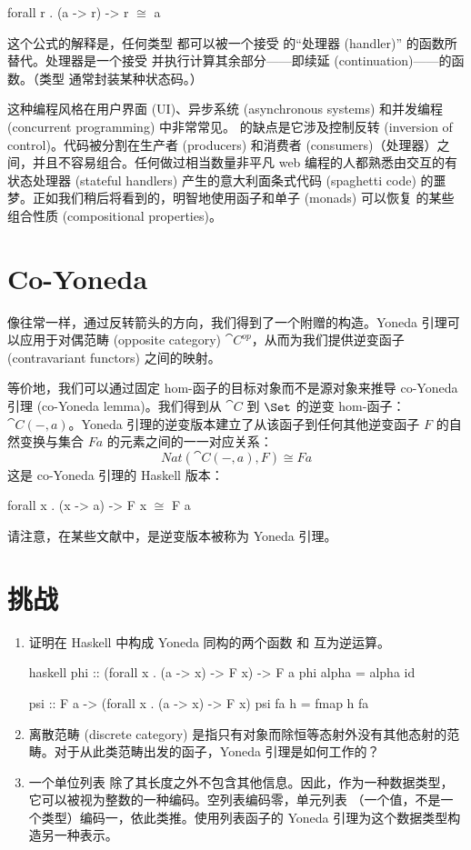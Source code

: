 \begin{snipv}
forall r . (a -> r) -> r \ensuremath{\cong} a
\end{snipv}
这个公式的解释是，任何类型  都可以被一个接受  的“处理器 (handler)” 的函数所替代。处理器是一个接受  并执行计算其余部分——即续延 (continuation)——的函数。（类型  通常封装某种状态码。）

这种编程风格在用户界面 (UI)、异步系统 (asynchronous systems) 和并发编程 (concurrent programming) 中非常常见。 的缺点是它涉及控制反转 (inversion of control)。代码被分割在生产者 (producers) 和消费者 (consumers)（处理器）之间，并且不容易组合。任何做过相当数量非平凡 web 编程的人都熟悉由交互的有状态处理器 (stateful handlers) 产生的意大利面条式代码 (spaghetti code) 的噩梦。正如我们稍后将看到的，明智地使用函子和单子 (monads) 可以恢复  的某些组合性质 (compositional properties)。

\section{Co-Yoneda}

像往常一样，通过反转箭头的方向，我们得到了一个附赠的构造。Yoneda 引理可以应用于对偶范畴 (opposite category) $\cat{C}^\mathit{op}$，从而为我们提供逆变函子 (contravariant functors) 之间的映射。

等价地，我们可以通过固定 hom-函子的目标对象而不是源对象来推导 co-Yoneda 引理 (co-Yoneda lemma)。我们得到从 $\cat{C}$ 到 $\Set$ 的逆变 hom-函子：$\cat{C}(-, a)$。Yoneda 引理的逆变版本建立了从该函子到任何其他逆变函子 $F$ 的自然变换与集合 $F a$ 的元素之间的一一对应关系：
\[\mathit{Nat}(\cat{C}(-, a), F) \cong F a\]
这是 co-Yoneda 引理的 Haskell 版本：

\begin{snipv}
forall x . (x -> a) -> F x \ensuremath{\cong} F a
\end{snipv}
请注意，在某些文献中，是逆变版本被称为 Yoneda 引理。

\section{挑战}

\begin{enumerate}
  \tightlist
  \item
        证明在 Haskell 中构成 Yoneda 同构的两个函数  和  互为逆运算。

        \begin{snip}{haskell}
phi :: (forall x . (a -> x) -> F x) -> F a
phi alpha = alpha id

psi :: F a -> (forall x . (a -> x) -> F x)
psi fa h = fmap h fa
\end{snip}
  \item
        离散范畴 (discrete category) 是指只有对象而除恒等态射外没有其他态射的范畴。对于从此类范畴出发的函子，Yoneda 引理是如何工作的？
  \item
        一个单位列表 \code{{[}(){]}} 除了其长度之外不包含其他信息。因此，作为一种数据类型，它可以被视为整数的一种编码。空列表编码零，单元列表 \code{{[}(){]}}（一个值，不是一个类型）编码一，依此类推。使用列表函子的 Yoneda 引理为这个数据类型构造另一种表示。
\end{enumerate}

